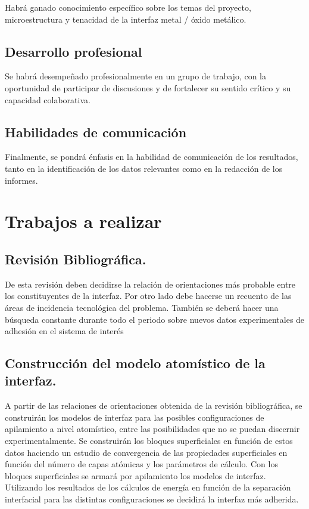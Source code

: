 Habrá ganado conocimiento específico sobre los temas del proyecto, 
microestructura y tenacidad de la interfaz metal / óxido metálico. 

\subsection{ Desarrollo profesional}

Se habrá desempeñado profesionalmente en un grupo de trabajo, con la 
oportunidad de participar de discusiones y de fortalecer su sentido crítico y 
su capacidad colaborativa.

\subsection{ Habilidades de comunicación }

Finalmente, se pondrá énfasis en la habilidad de comunicación de los 
resultados, tanto en la identificación de los datos relevantes como en la 
redacción de los informes. 

\section{Trabajos a realizar}

\subsection{ Revisión Bibliográfica. }

De esta revisión deben decidirse la relación de orientaciones más probable 
entre los constituyentes de la interfaz. Por otro lado debe hacerse un recuento 
de las áreas de incidencia tecnológica del problema. También se deberá hacer 
una búsqueda constante durante todo el periodo sobre nuevos datos 
experimentales de adhesión en el sistema de interés

\subsection{ Construcción del modelo atomístico de la interfaz.}

A partir de las relaciones de orientaciones obtenida de la revisión 
bibliográfica, se construirán los modelos de interfaz para las posibles 
configuraciones de apilamiento a nivel atomístico, entre las posibilidades que 
no se puedan discernir experimentalmente. Se construirán los bloques 
superficiales en función de estos datos haciendo un estudio de convergencia de 
las propiedades superficiales en función del número de capas atómicas y los 
parámetros de cálculo. Con los bloques superficiales se armará por apilamiento 
los modelos de interfaz. Utilizando los resultados de los cálculos de energía 
en función de la separación interfacial para las distintas configuraciones 
\cite{Jiangetal} 
se decidirá la interfaz más adherida.

